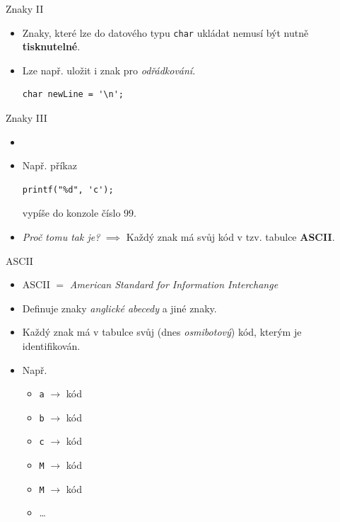 \documentclass[14pt,aspectratio=169]{beamer}
\begin{document}
    \begin{frame}[t,fragile]{Znaky \textrm{II}}
        \begin{itemize}
            \item Znaky, které lze do datového typu \texttt{char} ukládat nemusí být nutně \textbf{tisknutelné}.
            \item Lze např. uložit i znak pro \emph{odřádkování}.
            \begin{lstlisting}
char newLine = '\n';
            \end{lstlisting}
        \end{itemize}
    \end{frame}

    \begin{frame}[t,fragile]{Znaky \textrm{III}}
        \begin{itemize}
            \item {}
            \item Např. příkaz
            \begin{lstlisting}
printf("%d", 'c');
            \end{lstlisting}
            vypíše do konzole číslo $99$.
            \item \emph{Proč tomu tak je?} $\implies$ Každý znak má svůj kód v tzv. tabulce \textbf{ASCII}.
        \end{itemize}
    \end{frame}

    \begin{frame}[t,fragile]{ASCII}
        \begin{itemize}
            \item ASCII $=$ \emph{American Standard for Information Interchange}
            \item Definuje znaky \emph{anglické abecedy} a jiné znaky.
            \item Každý znak má v tabulce svůj (dnes \emph{osmibotový}) kód, kterým je identifikován.
            \item Např.
            \begin{itemize}
                \item \texttt{a} $\rightarrow$ kód 
                \item \texttt{b} $\rightarrow$ kód 
                \item \texttt{c} $\rightarrow$ kód 
                \item \texttt{M} $\rightarrow$ kód 
                \item \texttt{M} $\rightarrow$ kód 
                \item \dots
            \end{itemize}
        \end{itemize}
    \end{frame}
\end{document}
